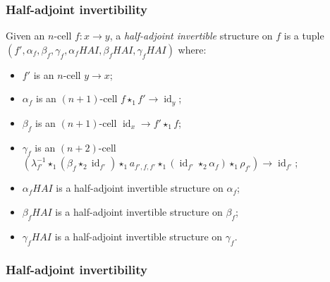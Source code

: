 \documentclass[presentation]{beamer}
\DeclareMathOperator{\id}{id}
\newcommand{\comp}{\star}
\begin{document}
\begin{frame}[fragile]
  \frametitle{Half-adjoint invertibility}
  \begin{definition}
  Given an \(n\)-cell \(f : x \to y\), a \emph{half-adjoint invertible} structure on \(f\) is a tuple \((f', \alpha_f, \beta_f, \gamma_f, \alpha_f{}HAI, \beta_f{}HAI, \gamma_f{}HAI)\) where:
  \begin{itemize}
  \item \(f'\) is an \(n\)-cell \(y \to x\);
  \item \(\alpha_f\) is an \((n+1)\)-cell \(f \comp_1 f' \to \id_y\);
  \item \(\beta_f\) is an \((n+1)\)-cell \(\id_x \to f' \comp_1 f\);
  \item \(\gamma_f\) is an \((n+2)\)-cell \((\lambda_{f'}^{-1} \comp_1 (\beta_f \comp_2
 \id_{f'}) \comp_1 a_{f',f,f'} \comp_1 (\id_{f'} \comp_2 \alpha_f) \comp_1 \rho_{f'}) \to \id_{f'}\);
  \item \(\alpha_f{}HAI\) is a half-adjoint invertible structure on \(\alpha_f\);
  \item \(\beta_f{}HAI\) is a half-adjoint invertible structure on \(\beta_f\);
  \item \(\gamma_f{}HAI\) is a half-adjoint invertible structure on \(\gamma_f\).
  \end{itemize}
  \end{definition}
\end{frame}

\begin{frame}
  \frametitle{Half-adjoint invertibility}
  \begin{center}
  \end{center}
\end{frame}
\end{document}
